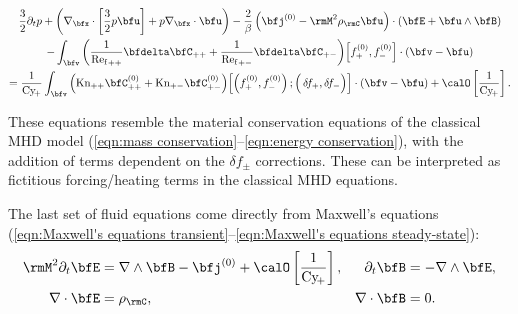         \vspace{-20pt}
        \begin{multline}\label{eqn:PiC-coupled pressure conservation}
            \frac{3}{2}\partial_{t}p + \left(\nabla_{\bfx}\cdot\left[\frac{3}{2}p\bfu\right] + p\nabla_{\bfx}\cdot\bfu\right) - \frac{2}{\beta}\left(\bfj^{(0)} - \rmM^{2}\rho_{\rmC}\bfu\right)\cdot(\bfE + \bfu\wedge\bfB)  \\
            - \int_{\bfv}\left(\frac{1}{{\rmRef}_{++}}\bfdelta\bfC_{++} + \frac{1}{{\rmRef}_{+-}}\bfdelta\bfC_{+-}\right)\!\left[f_{+}^{(0)}, f_{-}^{(0)}\right]\cdot(\bfv - \bfu)  \\
            =  \frac{1}{\rmCy\!_{+}}\int_{\bfv}\left(\rmKn_{++}\bfC_{++}^{(0)} + \rmKn_{+-}\bfC_{+-}^{(0)}\right)\!\left[\left(f_{+}^{(0)}, f_{-}^{(0)}\right); \left({\color{white} f_{+}^{(0)}}\!\!\!\!\!\!\!\!\!\delta\!f_{+}, \delta\!f_{-}\right)\right]\cdot(\bfv - \bfu) + \calO\left[\frac{1}{\rmCy\!_{+}}\right].
        \end{multline}
        
        These equations resemble the material conservation equations of the classical MHD model (\ref{eqn:mass conservation}--\ref{eqn:energy conservation}), with the addition of terms dependent on the $\delta\!f_{\pm}$ corrections. These can be interpreted as fictitious forcing/heating terms in the classical MHD equations.

        \shortline

        The last set of fluid equations come directly from Maxwell's equations (\ref{eqn:Maxwell's equations transient}--\ref{eqn:Maxwell's equations steady-state}):
        \begin{align}
            \rmM^{2}\partial_{t}\bfE  &=  \nabla\wedge\bfB - \bfj^{(0)} + \calO\left[\frac{1}{\rmCy\!_{+}}\right],  &
            \partial_{t}\bfB          &=  - \nabla\wedge\bfE,  \label{eqn:PiC-coupled Maxwell's equations transient}  \\
            \nabla\cdot\bfE           &=  \rho_{\rmC},  &
            \nabla\cdot\bfB           &=  0.  \label{eqn:PiC-coupled Maxwell's equations steady-state}
        \end{align}


